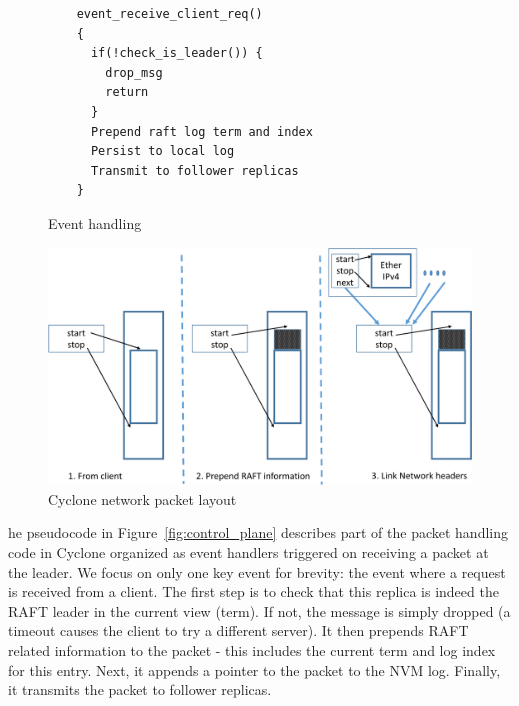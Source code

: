 \documentclass[letterpaper,twocolumn,10pt]{article}
\begin{document}
\begin{figure}
\begin{minipage}{.5\textwidth}
\scriptsize
\begin{verbatim}
    event_receive_client_req()
    {
      if(!check_is_leader()) {
        drop_msg
        return
      }
      Prepend raft log term and index
      Persist to local log
      Transmit to follower replicas
    }
\end{verbatim}
\caption{Event handling}
\label{fig:control_plane}
\end{minipage}
\begin{minipage}{.5\textwidth}
  \centering
  \includegraphics[scale=0.3]{figures2/network_packet.pdf}
  \caption{Cyclone network packet layout}
  \label{fig:packet_layout}
\end{minipage}
\end{figure}


he pseudocode in Figure~\ref{fig:control_plane} describes part of the packet
handling code in Cyclone organized as event handlers triggered on receiving a
packet at the leader. We focus on only one key event for brevity: the event
where a request is received from a client. The first step is to check that this
replica is indeed the RAFT leader in the current view (term). If not, the
message is simply dropped (a timeout causes the client to try a different
server). It then prepends RAFT related information to the packet - this includes
the current term and log index for this entry. Next, it appends a pointer to the packet to 
the NVM log. Finally, it transmits the packet to follower replicas.
\end{document}
